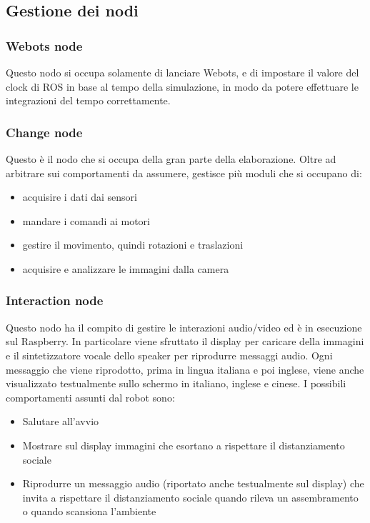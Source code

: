 \documentclass[a4paper]{article}
\begin{document}
	\subsection{Gestione dei nodi}\label{subsec:Gestione-dei-nodi}
	\subsubsection{Webots node}\label{subsubsec:Webots-node}
	Questo nodo si occupa solamente di lanciare Webots, e di impostare il
	valore del clock di ROS in base al tempo della simulazione, in modo da
	potere effettuare le integrazioni del tempo correttamente.
	\subsubsection{Change node}\label{subsubsec:Change-node}
	Questo è il nodo che si occupa della gran parte della elaborazione. Oltre
	ad arbitrare sui comportamenti da assumere, gestisce più moduli che si
	occupano di: 
	\begin{itemize}
		\item acquisire i dati dai sensori
		\item mandare i comandi ai motori
		\item gestire il movimento, quindi rotazioni e traslazioni
		\item acquisire e analizzare le immagini dalla camera
	\end{itemize}
	\subsubsection{Interaction node}\label{subsubsec:Interaction-node}
	Questo nodo ha il compito di gestire le interazioni audio/video ed è in esecuzione sul Raspberry. In
	particolare viene sfruttato il display per caricare della immagini e il
	sintetizzatore vocale dello speaker per riprodurre messaggi audio. Ogni
	messaggio che viene riprodotto, prima in lingua italiana e poi inglese,
	viene anche visualizzato testualmente sullo schermo in italiano, inglese e
	cinese.  I possibili comportamenti assunti dal robot sono:
	\begin{itemize}
		\item Salutare all'avvio
		\item Mostrare sul display immagini che esortano a rispettare il
			distanziamento sociale
		\item Riprodurre un messaggio audio (riportato anche testualmente sul
			display) che invita a rispettare il distanziamento sociale quando
			rileva un assembramento o quando scansiona l'ambiente
	\end{itemize}
\end{document}
